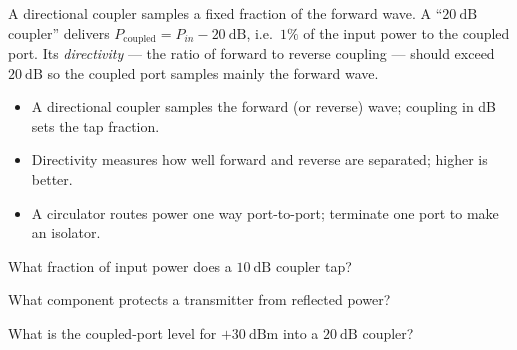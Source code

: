 \begin{workedexample}
A directional coupler samples a fixed fraction of the forward wave. A
``$20\ \text{dB}$ coupler'' delivers $P_{\text{coupled}} = P_{in} - 20\ \text{dB}$,
i.e.\ $1\%$ of the input power to the coupled port. Its \emph{directivity} --- the
ratio of forward to reverse coupling --- should exceed $20\ \text{dB}$ so the
coupled port samples mainly the forward wave.
\end{workedexample}

\begin{keytakeaways}
\begin{itemize}[leftmargin=1.4em,itemsep=2pt]
\item A directional coupler samples the forward (or reverse) wave; coupling in dB sets the tap fraction.
\item Directivity measures how well forward and reverse are separated; higher is better.
\item A circulator routes power one way port-to-port; terminate one port to make an isolator.
\end{itemize}
\end{keytakeaways}

\begin{exercises}
\item What fraction of input power does a $10\ \text{dB}$ coupler tap?
\item What component protects a transmitter from reflected power?
\item What is the coupled-port level for $+30\ \text{dBm}$ into a $20\ \text{dB}$ coupler?
\end{exercises}

